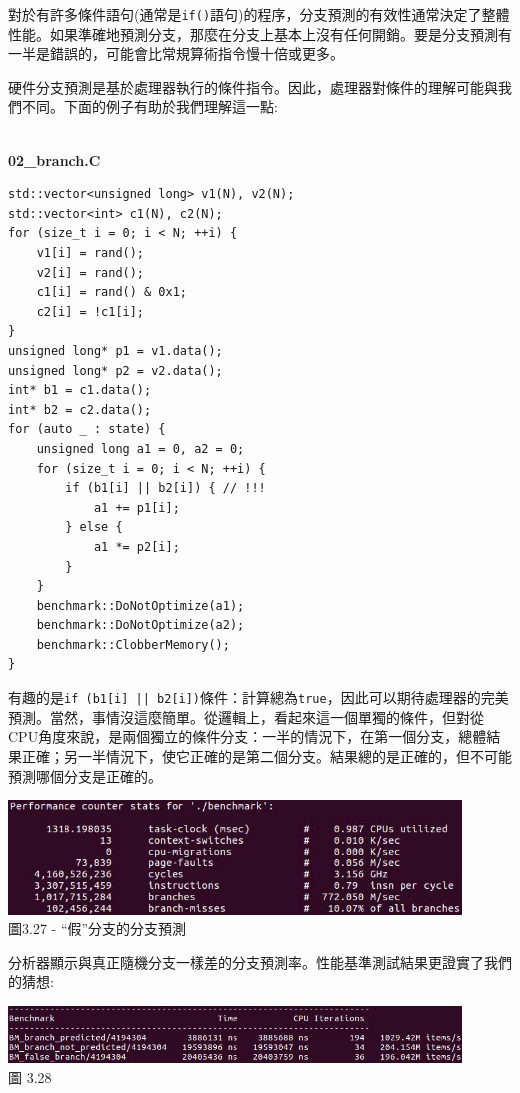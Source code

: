 對於有許多條件語句(通常是\texttt{if()}語句)的程序，分支預測的有效性通常決定了整體性能。如果準確地預測分支，那麼在分支上基本上沒有任何開銷。要是分支預測有一半是錯誤的，可能會比常規算術指令慢十倍或更多。

硬件分支預測是基於處理器執行的條件指令。因此，處理器對條件的理解可能與我們不同。下面的例子有助於我們理解這一點:

\hspace*{\fill} \\ %
\noindent
\textbf{02\_branch.C}
\begin{lstlisting}[style=styleCXX]
std::vector<unsigned long> v1(N), v2(N);
std::vector<int> c1(N), c2(N);
for (size_t i = 0; i < N; ++i) {
	v1[i] = rand();
	v2[i] = rand();
	c1[i] = rand() & 0x1;
	c2[i] = !c1[i];
}
unsigned long* p1 = v1.data();
unsigned long* p2 = v2.data();
int* b1 = c1.data();
int* b2 = c2.data();
for (auto _ : state) {
	unsigned long a1 = 0, a2 = 0;
	for (size_t i = 0; i < N; ++i) {
		if (b1[i] || b2[i]) { // !!!
			a1 += p1[i];
		} else {
			a1 *= p2[i];
		}
	}
	benchmark::DoNotOptimize(a1);
	benchmark::DoNotOptimize(a2);
	benchmark::ClobberMemory();
}
\end{lstlisting}

有趣的是\texttt{if (b1[i] || b2[i])}條件：計算總為\texttt{true}，因此可以期待處理器的完美預測。當然，事情沒這麼簡單。從邏輯上，看起來這一個單獨的條件，但對從CPU角度來說，是兩個獨立的條件分支：一半的情況下，在第一個分支，總體結果正確；另一半情況下，使它正確的是第二個分支。結果總的是正確的，但不可能預測哪個分支是正確的。

\begin{center}
\includegraphics[width=0.9\textwidth]{content/1/chapter3/images/27.jpg}\\
圖3.27 - “假”分支的分支預測
\end{center}

分析器顯示與真正隨機分支一樣差的分支預測率。性能基準測試結果更證實了我們的猜想:

\begin{center}
\includegraphics[width=0.9\textwidth]{content/1/chapter3/images/28.jpg}\\
圖 3.28
\end{center}

